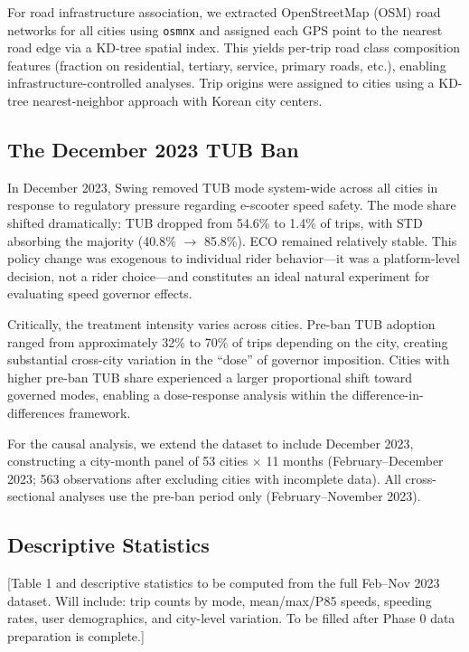 For road infrastructure association, we extracted OpenStreetMap (OSM) road networks for all cities using \texttt{osmnx} \citep{boeing2017osmnx} and assigned each GPS point to the nearest road edge via a KD-tree spatial index. This yields per-trip road class composition features (fraction on residential, tertiary, service, primary roads, etc.), enabling infrastructure-controlled analyses. Trip origins were assigned to cities using a KD-tree nearest-neighbor approach with Korean city centers.

\subsection{The December 2023 TUB Ban}
\label{sec:data_event}

In December 2023, Swing removed TUB mode system-wide across all cities in response to regulatory pressure regarding e-scooter speed safety. The mode share shifted dramatically: TUB dropped from 54.6\% to 1.4\% of trips, with STD absorbing the majority (40.8\% $\rightarrow$ 85.8\%). ECO remained relatively stable. This policy change was exogenous to individual rider behavior---it was a platform-level decision, not a rider choice---and constitutes an ideal natural experiment for evaluating speed governor effects.

Critically, the treatment intensity varies across cities. Pre-ban TUB adoption ranged from approximately 32\% to 70\% of trips depending on the city, creating substantial cross-city variation in the ``dose'' of governor imposition. Cities with higher pre-ban TUB share experienced a larger proportional shift toward governed modes, enabling a dose-response analysis within the difference-in-differences framework.

For the causal analysis, we extend the dataset to include December 2023, constructing a city-month panel of 53 cities $\times$ 11 months (February--December 2023; 563 observations after excluding cities with incomplete data). All cross-sectional analyses use the pre-ban period only (February--November 2023).

\subsection{Descriptive Statistics}
\label{sec:data_descriptive}

[Table 1 and descriptive statistics to be computed from the full Feb--Nov 2023 dataset. Will include: trip counts by mode, mean/max/P85 speeds, speeding rates, user demographics, and city-level variation. To be filled after Phase 0 data preparation is complete.]

